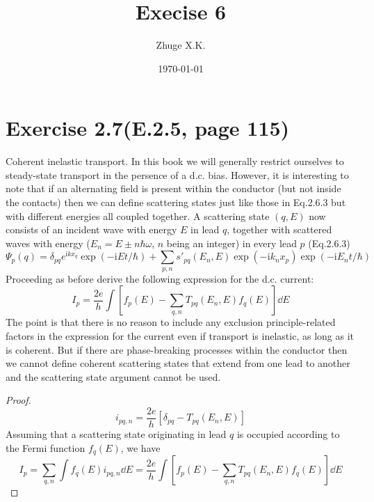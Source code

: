 \documentclass[11pt,a4paper]{article}
\title{Execise 6}
\author{Zhuge X.K.}
\date{\today}
\theoremstyle{plain}
\theoremstyle{definition}
\theoremstyle{remark}
\newcommand{\ii}{\mathrm{i}}                      %
\begin{document}
\maketitle
\section*{Exercise 2.7(E.2.5, page 115)}
Coherent inelastic transport. In this book we will generally restrict ourselves to steady-state transport in the persence of a d.c. bias. However, it is interesting to note that if an alternating field is present within the conductor (but not inside the contacts) then we can define scattering states just like those in Eq.2.6.3 but with different energies all coupled together. A scattering state $(q,E)$ now consists of an incident wave with energy $E$ in lead $q$, together with scattered waves with energy ($E_n = E \pm n\hbar \omega$, $n$ being an integer) in every lead $p$ (Eq.2.6.3)
\begin{equation*}
    \Psi_p(q) = \delta_{pq} e^{\ii k x_q}\exp(-\ii E t/\hbar) + \sum_{p,n} s'_{pq}(E_n,E) \exp(-\ii k_n x_p) \exp(-\ii E_n t/\hbar)
\end{equation*}
Proceeding as before derive the following expression for the d.c. current:
\begin{equation*}
    I_p = \frac{2e}{h} \int \left[ f_p(E) - \sum_{q,n}T_{pq}(E_n, E) f_q(E) \right] \dd E
\end{equation*}
The point is that there is no reason to include any exclusion principle-related factors in the expression for the current even if transport is inelastic, as long as it is coherent. But if there are phase-breaking processes within the conductor then we cannot define coherent scattering states that extend from one lead to another and the scattering state argument cannot be used.
\begin{proof}
    \begin{equation*}
        i_{pq,n} = \frac{2e}{h} \left[\delta_{pq} - T_{pq}(E_n,E)\right]
    \end{equation*}
    Assuming that a scattering state originating in lead $q$ is occupied according to the Fermi function $f_q(E)$, we have
    \begin{equation*}
        I_p = \sum_{q,n} \int f_q(E) i_{pq,n}\dd E = \frac{2e}{h} \int \left[ f_p(E) - \sum_{q,n} T_{pq}(E_n,E) f_q(E) \right] \dd E
    \end{equation*}
\end{proof}
\end{document}
